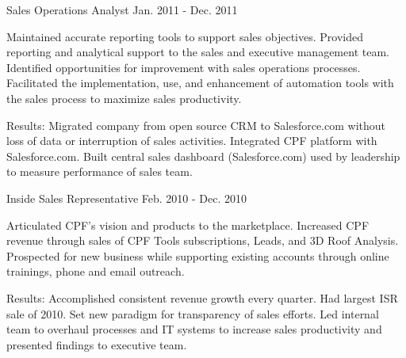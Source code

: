 \begin{cventries}

\cventry
{Sales Operations Analyst} %
{} %
{} %
{Jan. 2011 - Dec. 2011} %
{ %
\begin{cvitems}
\item {Maintained accurate reporting tools to support sales objectives. Provided reporting and analytical support to the sales and executive management team. Identified opportunities for improvement with sales operations processes. Facilitated the implementation, use, and enhancement of automation tools with the sales process to maximize sales productivity.}
\end{cvitems}
}
\begin{cvitemsnb}
\item {Results: Migrated company from open source CRM to Salesforce.com without loss of data or interruption of sales activities. Integrated CPF platform with Salesforce.com. Built central sales dashboard (Salesforce.com) used by leadership to measure performance of sales team.}
\end{cvitemsnb}

\cventry
{Inside Sales Representative} %
{} %
{} %
{Feb. 2010 - Dec. 2010} %
{ %
\begin{cvitems}
\item {Articulated CPF’s vision and products to the marketplace. Increased CPF revenue through sales of CPF Tools subscriptions, Leads, and 3D Roof Analysis. Prospected for new business while supporting existing accounts through online trainings, phone and email outreach.} %
\end{cvitems}
}
\begin{cvitemsnb}
\item {Results: Accomplished consistent revenue growth every quarter. Had largest ISR sale of 2010. Set new paradigm for transparency of sales efforts. Led internal team to overhaul processes and IT systems to increase sales productivity and presented findings to executive team.}
\end{cvitemsnb}	



\end{cventries}
